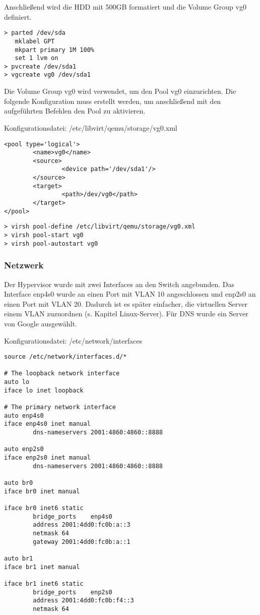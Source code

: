 Anschließend wird die HDD mit 500GB formatiert und die Volume Group {\sc vg0} definiert.

\begin{lstlisting}[numbers=none]
> parted /dev/sda
   mklabel GPT
   mkpart primary 1M 100%
   set 1 lvm on
> pvcreate /dev/sda1
> vgcreate vg0 /dev/sda1
\end{lstlisting} 

Die Volume Group {\sc vg0} wird verwendet, um den Pool {\sc vg0} einzurichten. Die folgende Konfiguration muss erstellt werden, um anschließend mit den aufgeführten Befehlen den Pool zu aktivieren.       

Konfigurationsdatei: {\sc /etc/libvirt/qemu/storage/vg0.xml}
\begin{lstlisting}
<pool type='logical'>
        <name>vg0</name>
        <source>
                <device path='/dev/sda1'/>
        </source>
        <target>
                <path>/dev/vg0</path>
        </target>
</pool>
\end{lstlisting}
\begin{lstlisting}[numbers=none]
> virsh pool-define /etc/libvirt/qemu/storage/vg0.xml
> virsh pool-start vg0
> virsh pool-autostart vg0
\end{lstlisting}

\subsubsection{Netzwerk}

Der Hypervisor wurde mit zwei Interfaces an den Switch angebunden. Das Interface {\sc enp4s0} wurde an einen Port mit VLAN 10 angeschlossen und {\sc enp2s0} an einen Port mit VLAN 20. Dadurch ist es später einfacher, die virtuellen Server einem VLAN zuzuordnen (s. Kapitel \ql Linux-Server\qr). Für DNS wurde ein Server von Google ausgewählt.

Konfigurationsdatei: {\sc /etc/network/interfaces}
\begin{lstlisting}
source /etc/network/interfaces.d/*

# The loopback network interface
auto lo
iface lo inet loopback

# The primary network interface
auto enp4s0
iface enp4s0 inet manual
        dns-nameservers 2001:4860:4860::8888

auto enp2s0
iface enp2s0 inet manual
        dns-nameservers 2001:4860:4860::8888

auto br0
iface br0 inet manual

iface br0 inet6 static
        bridge_ports    enp4s0
        address 2001:4dd0:fc0b:a::3
        netmask 64
        gateway 2001:4dd0:fc0b:a::1

auto br1
iface br1 inet manual

iface br1 inet6 static
        bridge_ports    enp2s0
        address 2001:4dd0:fc0b:f4::3
        netmask 64
\end{lstlisting}